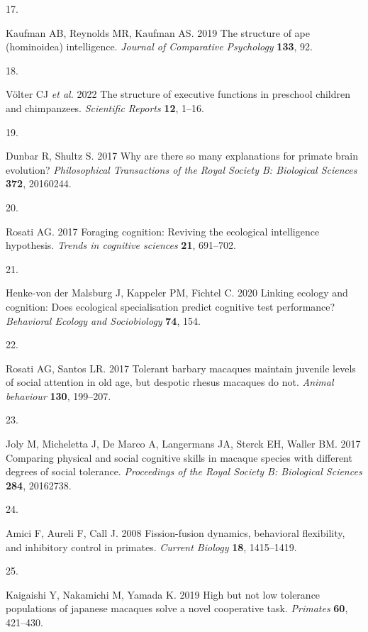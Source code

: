 \documentclass[
  man,floatsintext]{apa6}
\newlength{\cslhangindent}
\newlength{\csllabelwidth}
\newenvironment{CSLReferences}[2] %
 {\begin{list}{}{%
  \setlength{\itemindent}{0pt}
  \setlength{\leftmargin}{0pt}
  \setlength{\parsep}{0pt}
  \ifodd #1
   \setlength{\leftmargin}{\cslhangindent}
   \setlength{\itemindent}{-1\cslhangindent}
  \fi
  \setlength{\itemsep}{#2\baselineskip}}}
 {\end{list}}
\newcommand{\CSLLeftMargin}[1]{\parbox[t]{\csllabelwidth}{\strut#1\strut}}
\newcommand{\CSLRightInline}[1]{\parbox[t]{\linewidth - \csllabelwidth}{\strut#1\strut}}
\begin{document}
\begin{CSLReferences}{0}{1}
\CSLLeftMargin{17. }%
\CSLRightInline{Kaufman AB, Reynolds MR, Kaufman AS. 2019 The structure of ape (hominoidea) intelligence. \emph{Journal of Comparative Psychology} \textbf{133}, 92.}

\CSLLeftMargin{18. }%
\CSLRightInline{Völter CJ \emph{et al.} 2022 The structure of executive functions in preschool children and chimpanzees. \emph{Scientific Reports} \textbf{12}, 1--16.}

\CSLLeftMargin{19. }%
\CSLRightInline{Dunbar R, Shultz S. 2017 Why are there so many explanations for primate brain evolution? \emph{Philosophical Transactions of the Royal Society B: Biological Sciences} \textbf{372}, 20160244.}

\CSLLeftMargin{20. }%
\CSLRightInline{Rosati AG. 2017 Foraging cognition: Reviving the ecological intelligence hypothesis. \emph{Trends in cognitive sciences} \textbf{21}, 691--702.}

\CSLLeftMargin{21. }%
\CSLRightInline{Henke-von der Malsburg J, Kappeler PM, Fichtel C. 2020 Linking ecology and cognition: Does ecological specialisation predict cognitive test performance? \emph{Behavioral Ecology and Sociobiology} \textbf{74}, 154.}

\CSLLeftMargin{22. }%
\CSLRightInline{Rosati AG, Santos LR. 2017 Tolerant barbary macaques maintain juvenile levels of social attention in old age, but despotic rhesus macaques do not. \emph{Animal behaviour} \textbf{130}, 199--207.}

\CSLLeftMargin{23. }%
\CSLRightInline{Joly M, Micheletta J, De Marco A, Langermans JA, Sterck EH, Waller BM. 2017 Comparing physical and social cognitive skills in macaque species with different degrees of social tolerance. \emph{Proceedings of the Royal Society B: Biological Sciences} \textbf{284}, 20162738.}

\CSLLeftMargin{24. }%
\CSLRightInline{Amici F, Aureli F, Call J. 2008 Fission-fusion dynamics, behavioral flexibility, and inhibitory control in primates. \emph{Current Biology} \textbf{18}, 1415--1419.}

\CSLLeftMargin{25. }%
\CSLRightInline{Kaigaishi Y, Nakamichi M, Yamada K. 2019 High but not low tolerance populations of japanese macaques solve a novel cooperative task. \emph{Primates} \textbf{60}, 421--430.}


\end{CSLReferences}
\end{document}
